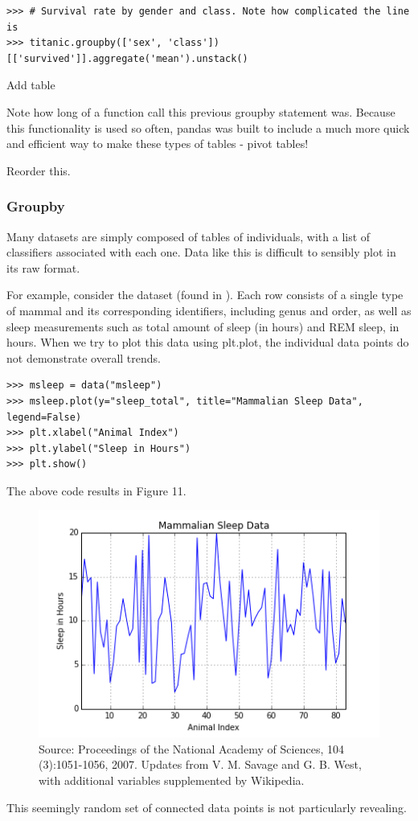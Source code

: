 \begin{lstlisting}
>>> # Survival rate by gender and class. Note how complicated the line is
>>> titanic.groupby(['sex', 'class'])[['survived']].aggregate('mean').unstack()
\end{lstlisting}

Add table

Note how long of a function call this previous groupby statement was. Because this functionality is used so often, pandas was built to include a much more quick and efficient way to make these types of tables - pivot tables!

Reorder this.

\subsubsection*{Groupby}
Many datasets are simply composed of tables of individuals, with a list of classifiers associated with each one.
Data like this is difficult to sensibly plot in its raw format.

For example, consider the  dataset (found in ). 
Each row consists of a single type of mammal and its corresponding identifiers, including genus and order, as well as sleep measurements such as total amount of sleep (in hours) and REM sleep, in hours.
When we try to plot this data using plt.plot, the individual data points do not demonstrate overall trends.
\begin{lstlisting}
>>> msleep = data("msleep")
>>> msleep.plot(y="sleep_total", title="Mammalian Sleep Data", legend=False)
>>> plt.xlabel("Animal Index")
>>> plt.ylabel("Sleep in Hours")
>>> plt.show()
\end{lstlisting}
The above code results in Figure 11.
\begin{figure}[H] 
    \centering
    \includegraphics[width=.75\textwidth]{Msleep1.png}
    \caption{Source:  Proceedings of the National Academy of Sciences, 104 (3):1051-1056, 2007. Updates from V. M. Savage and G. B. West, with additional variables supplemented by Wikipedia.}
    \label{fig:aplot}
\end{figure}
This seemingly random set of connected data points is not particularly revealing.


